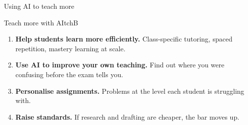 \documentclass[aspectratio=169, 10pt]{beamer}
\begin{document}
\begin{frame}{Using AI to teach more}

\begin{mckcardg}[mckteal]{Teach more with AI}{tchB}
\begin{enumerate}\setlength{\itemsep}{2pt}\setcounter{enumi}{3}
  \item \textbf{Help students learn more efficiently.} Class-specific tutoring, spaced repetition, mastery learning at scale.
  \item \textbf{Use AI to improve your own teaching.} Find out where you were confusing before the exam tells you.
  \item \textbf{Personalise assignments.} Problems at the level each student is struggling with.
  \item \textbf{Raise standards.} If research and drafting are cheaper, the bar moves up.
\end{enumerate}
\end{mckcardg}

\end{frame}





\end{document}

